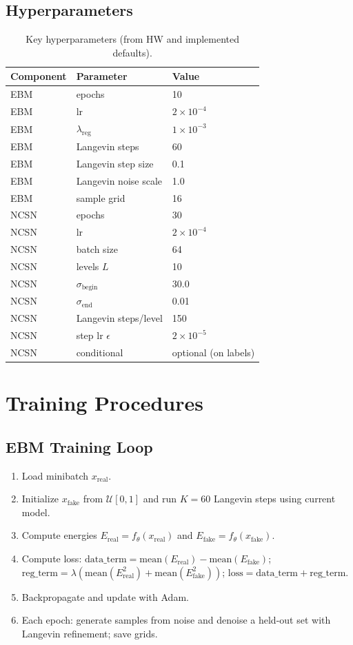 \documentclass[a4paper,12pt]{article}
\begin{document}
\subsection{Hyperparameters}
\begin{table}[H]
\centering
\caption{Key hyperparameters (from HW and implemented defaults).}
\begin{tabular}{lll}
\toprule
Component & Parameter & Value \\
\midrule
EBM & epochs & 10 \\
EBM & lr & $2 \times 10^{-4}$ \\
EBM & $\lambda_{\text{reg}}$ & $1 \times 10^{-3}$ \\
EBM & Langevin steps & 60 \\
EBM & Langevin step size & 0.1 \\
EBM & Langevin noise scale & 1.0 \\
EBM & sample grid & 16 \\
NCSN & epochs & 30 \\
NCSN & lr & $2 \times 10^{-4}$ \\
NCSN & batch size & 64 \\
NCSN & levels $L$ & 10 \\
NCSN & $\sigma_{\text{begin}}$ & 30.0 \\
NCSN & $\sigma_{\text{end}}$ & 0.01 \\
NCSN & Langevin steps/level & 150 \\
NCSN & step lr $\epsilon$ & $2 \times 10^{-5}$ \\
NCSN & conditional & optional (on labels) \\
\bottomrule
\end{tabular}
\end{table}

\section{Training Procedures}
\subsection{EBM Training Loop}
\begin{enumerate}[leftmargin=*]
    \item Load minibatch $x_{\text{real}}$.
    \item Initialize $x_{\text{fake}}$ from $\mathcal{U}[0,1]$ and run $K=60$ Langevin steps using current model.
    \item Compute energies $E_{\text{real}} = f_\theta(x_{\text{real}})$ and $E_{\text{fake}} = f_\theta(x_{\text{fake}})$.
    \item Compute loss: $\text{data\_term} = \text{mean}(E_{\text{real}}) - \text{mean}(E_{\text{fake}})$; $\text{reg\_term} = \lambda (\text{mean}(E_{\text{real}}^2) + \text{mean}(E_{\text{fake}}^2))$; $\text{loss} = \text{data\_term} + \text{reg\_term}$.
    \item Backpropagate and update with Adam.
    \item Each epoch: generate samples from noise and denoise a held-out set with Langevin refinement; save grids.
\end{enumerate}
\end{document}

